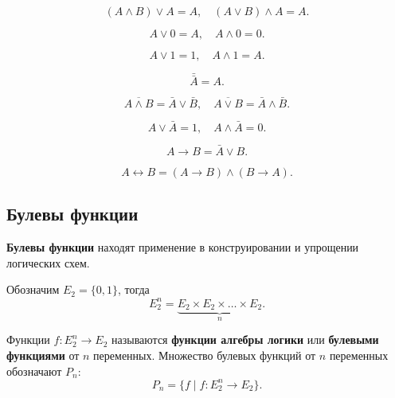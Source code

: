 \begin{property}[Поглощение]
    \[
        (A \land B) \lor A = A,
        \quad
        (A \lor B) \land A = A.
    \]
\end{property}

\begin{property}
    \[
        A \lor 0 = A,
        \quad
        A \land 0 = 0.
    \]
\end{property}

\begin{property}
    \[
        A \lor 1 = 1,
        \quad
        A \land 1 = A.
    \]
\end{property}

\begin{property}[Инволютивность]
    \[
        \bar{\bar{A}} = A.
    \]
\end{property}

\begin{property}
    \[
        \overline{A \land B} = \bar{A} \lor \bar{B},
        \quad
        \overline{A \lor B} = \bar{A} \land \bar{B}.
    \]
\end{property}

\begin{property}
    \[
        A \lor \bar{A} = 1,
        \quad
        A \land \bar{A} = 0.
    \]
\end{property}

\begin{property}
    \[
        A \to B = \bar{A} \lor B.
    \]
\end{property}

\begin{property}
    \[
        A \leftrightarrow B = (A \to B) \land (B \to A).
    \]
\end{property}

\subsection{Булевы функции}

\textbf{Булевы функции} находят применение в конструировании и упрощении логических схем.

Обозначим \(E_2 = \{0, 1\}\), тогда
\[
    E_2^n = \underbrace{E_2 \times E_2 \times \ldots \times E_2}_{n}.
\]

Функции \(f: E_2^n \to E_2\) называются \textbf{функции алгебры логики} или \textbf{булевыми функциями} от \(n\) переменных. Множество булевых функций от \(n\) переменных обозначают \(P_n\):
\[
    P_n = \{f \mid f : E_2^n \to E_2\}.
\]


